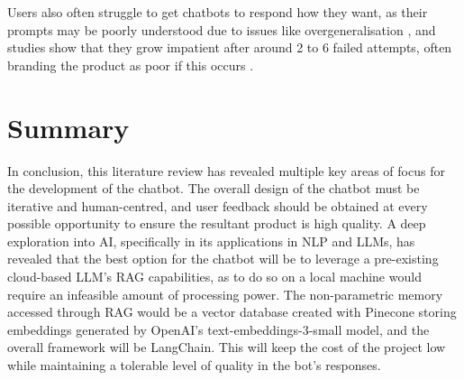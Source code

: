 \documentclass[12pt]{report}
\begin{document}
    Users also often struggle to get chatbots to respond how they want, as their prompts may be poorly understood
    due to issues like overgeneralisation \autocite{zamfirescu-pereira_why_2023}, and studies show that they
    grow impatient after around 2 to 6 failed attempts, often branding the product as poor if this occurs \autocite{luger_like_2016}.


    \pagebreak 

    \section{Summary}

    In conclusion, this literature review has revealed multiple key areas of focus for the development of the 
    chatbot. The overall design of the chatbot must be iterative and human-centred, and user feedback should 
    be obtained at every possible opportunity to ensure the resultant product is high quality. A deep exploration 
    into AI, specifically in its applications in NLP and LLMs, has revealed that the best option for the chatbot 
    will be to leverage a pre-existing cloud-based LLM's RAG capabilities, as to do so on a local machine would require an infeasible amount of processing power.
    The non-parametric memory accessed through RAG would be a vector database created with Pinecone storing embeddings generated by OpenAI's text-embeddings-3-small 
    model, and the overall framework will be LangChain. This will keep the cost of the project low while maintaining a tolerable level of quality in the bot's responses.

\end{document}
